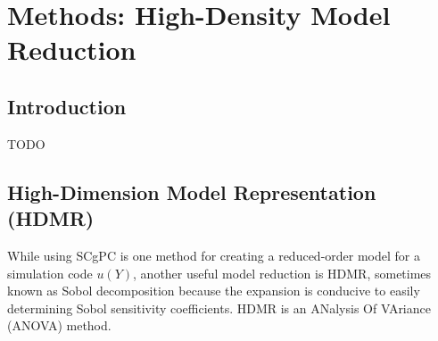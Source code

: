 
\chapter{Methods: High-Density Model Reduction} %

\label{ch:methods hdmr} %



\section{Introduction}
TODO



\section{High-Dimension Model Representation (HDMR)}\label{sec:hdmr}
While using SCgPC is one method for creating a reduced-order model for a simulation code $u(Y)$, another
useful model reduction is HDMR\cite{hdmr}, sometimes known as Sobol decomposition because the expansion is
conducive to easily determining Sobol sensitivity coefficients.  HDMR is an ANalysis Of VAriance (ANOVA)
method.


